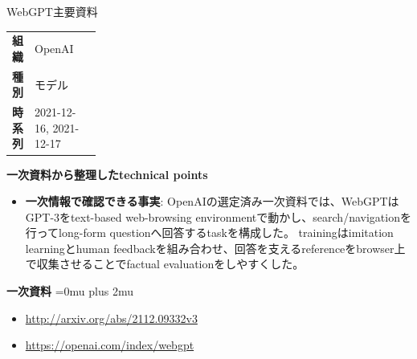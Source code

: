 \begin{technicalnote}{WebGPT}{主要資料}
\begingroup
\begin{tabularx}{\linewidth}{@{}>{\bfseries}p{0.22\linewidth}X@{}}
組織 & OpenAI \\
種別 & モデル \\
時系列 & 2021-12-16, 2021-12-17 \\
\end{tabularx}
\smallskip
\begin{minipage}{\linewidth}
{\bfseries 一次資料から整理したtechnical points}
\begin{itemize}[leftmargin=1.5em,itemsep=0.35em]
\item \textbf{一次情報で確認できる事実}: OpenAIの選定済み一次資料では、WebGPTはGPT-3をtext-based web-browsing environmentで動かし、search/navigationを行ってlong-form questionへ回答するtaskを構成した。 trainingはimitation learningとhuman feedbackを組み合わせ、回答を支えるreferenceをbrowser上で収集させることでfactual evaluationをしやすくした。
\end{itemize}
\begin{minipage}{\linewidth}
\begin{samepage}
{\bfseries 一次資料}
\begingroup\sloppy
\Urlmuskip=0mu plus 2mu\relax
\begin{itemize}[leftmargin=1.5em,itemsep=0.25em]
\item {\scriptsize\url{http://arxiv.org/abs/2112.09332v3}}
\item {\scriptsize\url{https://openai.com/index/webgpt}}
\end{itemize}
\endgroup
\end{samepage}
\end{minipage}
\end{minipage}
\endgroup
\end{technicalnote}
\medskip
